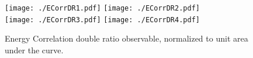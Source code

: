 \begin{figure}
    \begin{center}
        \texttt{[image: ./ECorrDR1.pdf]}
        \texttt{[image: ./ECorrDR2.pdf]}\\
        \texttt{[image: ./ECorrDR3.pdf]}
        \texttt{[image: ./ECorrDR4.pdf]}\\
        \caption{ Energy Correlation double ratio observable, normalized to unit area under the curve. }
        \label{fig:ECorrDR}
    \end{center}
\end{figure}
